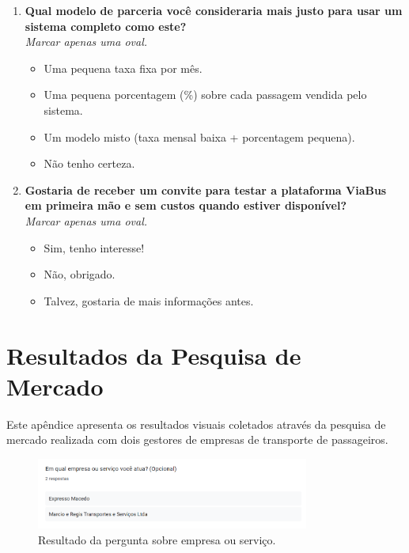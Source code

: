 \begin{apendicesenv}
\begin{enumerate}
    \item \textbf{Qual modelo de parceria você consideraria mais justo para usar um sistema completo como este?} \\
          \textit{Marcar apenas uma oval.}
          \begin{itemize}
            \item Uma pequena taxa fixa por mês.
            \item Uma pequena porcentagem (\%) sobre cada passagem vendida pelo sistema.
            \item Um modelo misto (taxa mensal baixa + porcentagem pequena).
            \item Não tenho certeza.
          \end{itemize}

    \item \textbf{Gostaria de receber um convite para testar a plataforma ViaBus em primeira mão e sem custos quando estiver disponível?} \\
          \textit{Marcar apenas uma oval.}
          \begin{itemize}
            \item Sim, tenho interesse!
            \item Não, obrigado.
            \item Talvez, gostaria de mais informações antes.
          \end{itemize}
  \end{enumerate}


  \chapter{Resultados da Pesquisa de Mercado}
  \label{apendice:resultados}

  Este apêndice apresenta os resultados visuais coletados através da pesquisa de mercado realizada com dois gestores de empresas de transporte de passageiros.

  \begin{figure}[htbp]
    \centering
    \includegraphics[width=0.8\textwidth]{imagens/imagem1.png}
    \caption{Resultado da pergunta sobre empresa ou serviço.}
    \label{fig:empresa-ou-servico}
  \end{figure}


\end{apendicesenv}
